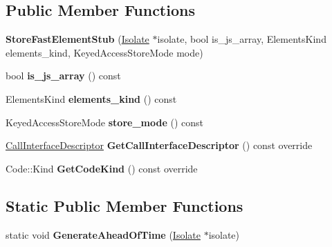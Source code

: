 \subsection*{Public Member Functions}
\begin{DoxyCompactItemize}
\item 
{\bfseries Store\+Fast\+Element\+Stub} (\hyperlink{classv8_1_1internal_1_1_isolate}{Isolate} $\ast$isolate, bool is\+\_\+js\+\_\+array, Elements\+Kind elements\+\_\+kind, Keyed\+Access\+Store\+Mode mode)\hypertarget{classv8_1_1internal_1_1_store_fast_element_stub_a0c9f3345e32d76dc53969cdddf57df46}{}\label{classv8_1_1internal_1_1_store_fast_element_stub_a0c9f3345e32d76dc53969cdddf57df46}

\item 
bool {\bfseries is\+\_\+js\+\_\+array} () const \hypertarget{classv8_1_1internal_1_1_store_fast_element_stub_a0a043bba6634cf33f975526dfd4fa997}{}\label{classv8_1_1internal_1_1_store_fast_element_stub_a0a043bba6634cf33f975526dfd4fa997}

\item 
Elements\+Kind {\bfseries elements\+\_\+kind} () const \hypertarget{classv8_1_1internal_1_1_store_fast_element_stub_a33755027028d35ce261cc544f63b4b40}{}\label{classv8_1_1internal_1_1_store_fast_element_stub_a33755027028d35ce261cc544f63b4b40}

\item 
Keyed\+Access\+Store\+Mode {\bfseries store\+\_\+mode} () const \hypertarget{classv8_1_1internal_1_1_store_fast_element_stub_a0e30fa4824ae7b549aae609619c56cc7}{}\label{classv8_1_1internal_1_1_store_fast_element_stub_a0e30fa4824ae7b549aae609619c56cc7}

\item 
\hyperlink{classv8_1_1internal_1_1_call_interface_descriptor}{Call\+Interface\+Descriptor} {\bfseries Get\+Call\+Interface\+Descriptor} () const  override\hypertarget{classv8_1_1internal_1_1_store_fast_element_stub_a4c899143d162889bd09f355aa61cb84e}{}\label{classv8_1_1internal_1_1_store_fast_element_stub_a4c899143d162889bd09f355aa61cb84e}

\item 
Code\+::\+Kind {\bfseries Get\+Code\+Kind} () const  override\hypertarget{classv8_1_1internal_1_1_store_fast_element_stub_ae21afdf78204b7e33aefe0f1a0cbb9df}{}\label{classv8_1_1internal_1_1_store_fast_element_stub_ae21afdf78204b7e33aefe0f1a0cbb9df}

\end{DoxyCompactItemize}
\subsection*{Static Public Member Functions}
\begin{DoxyCompactItemize}
\item 
static void {\bfseries Generate\+Ahead\+Of\+Time} (\hyperlink{classv8_1_1internal_1_1_isolate}{Isolate} $\ast$isolate)\hypertarget{classv8_1_1internal_1_1_store_fast_element_stub_adf839fc56fda8cd4df688c93b9a4731e}{}\label{classv8_1_1internal_1_1_store_fast_element_stub_adf839fc56fda8cd4df688c93b9a4731e}

\end{DoxyCompactItemize}
